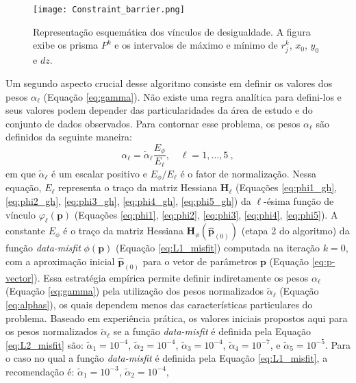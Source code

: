 \begin{figure}[!htb]
	\centering
	\texttt{[image: Constraint\_barrier.png]}
	\caption{Representação esquemática dos vínculos de desigualdade. A figura exibe os prisma $P^k$ e os intervalos de máximo e mínimo de $r^k_j$, $x_0$, $y_0$ e $ dz $.}
	\label{fig:barreira}
\end{figure}

Um segundo aspecto crucial desse algoritmo consiste em definir os valores dos pesos $\alpha_{\ell}$ (Equação \ref{eq:gamma}). 
Não existe uma regra analítica para defini-los e seus valores podem depender das particularidades da área de estudo e do conjunto de dados observados.
Para contornar esse problema, os pesos $\alpha_{\ell}$ são definidos da seguinte maneira:
\begin{equation}\label{eq:alphas}
\alpha_{\ell} = \tilde{\alpha}_{\ell} \frac{E_{\phi}}{E_{\ell}}, 
\quad \ell = 1,\dots, 5 \: ,
\end{equation}
em que $\tilde{\alpha}_{\ell}$ é um escalar positivo e $ E_{\phi}/E_{\ell} $ 
é o fator de normalização.
Nessa equação, $E_{\ell}$ representa o traço da matriz Hessiana $\mathbf{H}_{\ell}$ (Equações \ref{eq:phi1_gh}, \ref{eq:phi2_gh}, \ref{eq:phi3_gh}, \ref{eq:phi4_gh}, \ref{eq:phi5_gh}) da $\ell$-ésima função de vínculo $\varphi_{\ell}(\mathbf{p})$
(Equações \ref{eq:phi1}, \ref{eq:phi2}, \ref{eq:phi3}, \ref{eq:phi4}, \ref{eq:phi5}).
A constante $E_{\phi}$ é o traço da matriz Hessiana
$\mathbf{H}_{\phi}(\hat{\mathbf{p}}_{(0)})$ (etapa 2 do algoritmo) da função \textit{data-misfit} $\phi(\mathbf{p})$ (Equação \ref{eq:L1_misfit}) computada na iteração
$k = 0$, com a aproximação inicial $\hat{\mathbf{p}}_{(0)}$ para o vetor de parâmetros $ \mathbf{p} $ (Equação \ref{eq:p-vector}).
Essa estratégia empírica permite definir indiretamente os pesos $\alpha_{\ell}$ 
(Equação \ref{eq:gamma}) pela utilização dos pesos normalizados $\tilde{\alpha}_{\ell}$ 
(Equação \ref{eq:alphas}), os quais dependem menos das características particulares do problema.
Baseado em experiência prática, os valores iniciais propostos aqui para os pesos normalizados $\tilde{\alpha}_{\ell}$ se a função \textit{data-misfit} é definida pela Equação \ref{eq:L2_misfit} são:
$\tilde{\alpha}_{1} = 10^{-4}$, $\tilde{\alpha}_{2} = 10^{-4}$, 
$\tilde{\alpha}_{3} = 10^{-4}$, $\tilde{\alpha}_{4} = 10^{-7}$, e 
$\tilde{\alpha}_{5} = 10^{-5}$. 
Para o caso no qual a função \textit{data-misfit} é definida pela 
Equação \ref{eq:L1_misfit}, a recomendação é:
$\tilde{\alpha}_{1} = 10^{-3}$, $\tilde{\alpha}_{2} = 10^{-4}$, 
